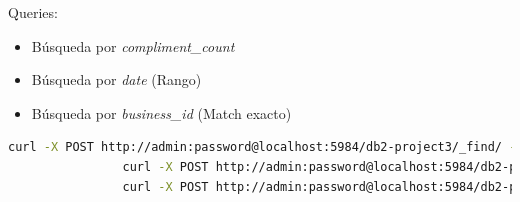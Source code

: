 \documentclass{article}
\begin{document}
		Queries:
		\begin{itemize}
			\item Búsqueda por \textit{compliment\_count}
			\item Búsqueda por \textit{date} (Rango)
			\item Búsqueda por \textit{business\_id} (Match exacto)
		\end{itemize}
		\begin{lstlisting}[language = bash, gobble = 28]
				curl -X POST http://admin:password@localhost:5984/db2-project3/_find/ -d '{ "selector": { "compliment_count": { "$gt": 5 } } }' -H "Content-Type:application/json"
				curl -X POST http://admin:password@localhost:5984/db2-project3/_find/ -d '{ "selector": { "date": { "$gt": "2012-02-06 01:30:34", "$lt": "2012-02-08 06:40:50" } } }' -H "Content-Type:application/json"
				curl -X POST http://admin:password@localhost:5984/db2-project3/_find/ -d '{ "selector": { "business_id": { "$eq": "UOST50KiVrSFTPMXGH9njg" } } }' -H "Content-Type:application/json"
		\end{lstlisting}
\end{document}
